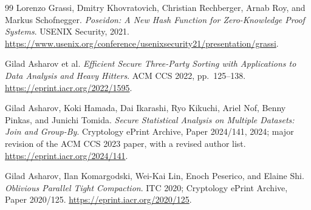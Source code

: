 \documentclass[11pt]{article}
\begin{document}
\begin{thebibliography}{99}
Lorenzo Grassi, Dmitry Khovratovich, Christian Rechberger, Arnab Roy, and Markus Schofnegger.
\emph{Poseidon: A New Hash Function for Zero-Knowledge Proof Systems}.
USENIX Security, 2021.
\url{https://www.usenix.org/conference/usenixsecurity21/presentation/grassi}.

Gilad Asharov et al.
\emph{Efficient Secure Three-Party Sorting with Applications to Data Analysis and Heavy Hitters}.
ACM CCS 2022, pp.~125--138.
\url{https://eprint.iacr.org/2022/1595}.

Gilad Asharov, Koki Hamada, Dai Ikarashi, Ryo Kikuchi, Ariel Nof, Benny Pinkas, and Junichi Tomida.
\emph{Secure Statistical Analysis on Multiple Datasets: Join and Group-By}.
Cryptology ePrint Archive, Paper 2024/141, 2024;
major revision of the ACM CCS 2023 paper, with a revised author list.
\url{https://eprint.iacr.org/2024/141}.

Gilad Asharov, Ilan Komargodski, Wei-Kai Lin, Enoch Peserico, and Elaine Shi.
\emph{Oblivious Parallel Tight Compaction}.
ITC 2020; Cryptology ePrint Archive, Paper 2020/125.
\url{https://eprint.iacr.org/2020/125}.

\end{thebibliography}
\end{document}
